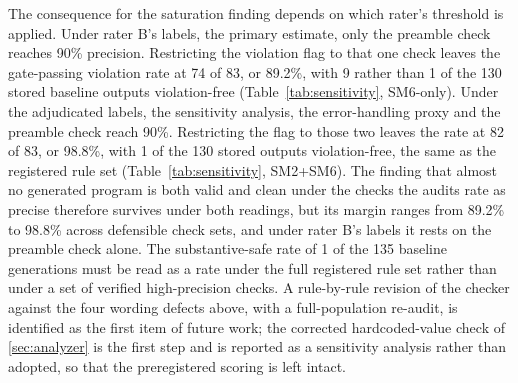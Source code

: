 \documentclass{ieeeaccess}
\begin{document}
The consequence for the saturation finding depends on which
rater's threshold is applied. Under rater B's labels, the primary estimate, only the
preamble check reaches 90\% precision. Restricting the violation flag to that one check
leaves the gate-passing violation rate at 74 of 83, or 89.2\%, with 9 rather than 1 of the
130 stored baseline outputs violation-free (Table~\ref{tab:sensitivity}, SM6-only). Under
the adjudicated labels, the sensitivity analysis, the error-handling proxy and the preamble
check reach 90\%. Restricting the flag to those two leaves the rate at 82 of 83, or
98.8\%, with 1 of the 130 stored outputs violation-free, the same as the registered
rule set (Table~\ref{tab:sensitivity}, SM2+SM6). The finding that almost no generated
program is both valid and clean under the checks the audits rate as precise therefore
survives under both readings, but its margin ranges from 89.2\% to 98.8\% across defensible
check sets, and under rater B's labels it rests on the preamble check alone. The
substantive-safe rate of 1 of the 135 baseline generations must be read as a rate under the full registered
rule set rather than under a set of verified high-precision checks. A rule-by-rule
revision of the checker against the four wording defects above, with a full-population
re-audit, is identified as the first item of future work; the corrected hardcoded-value
check of \ref{sec:analyzer} is the first step and is reported as a sensitivity analysis
rather than adopted, so that the preregistered scoring is left intact.


\end{document}
